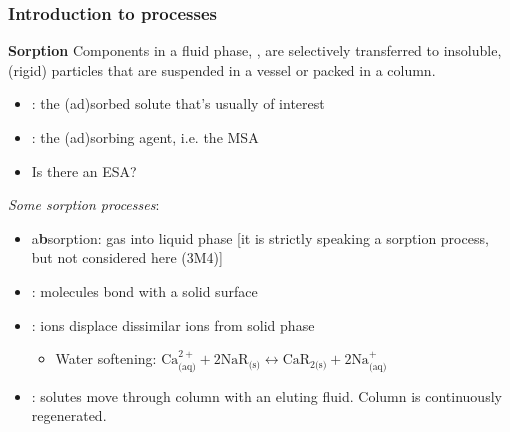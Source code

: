 \begin{comment}
	Pretreatment prior to carbon adsorption is usually for removal of suspended solids. Often this process is used as tertiary treatment after primary and biological treatment. In either situation, the carbon columns must be designed to provide for backwash. Some solids will escape pretreatment, and biological growth will occur on the carbon, even with extensive pretreatment. Originally carbon treatment was viewed only as applicable for removal of toxic organics or those that are difficult to degrade biologically. Present practice applies carbon adsorption as a procedure for removal of all types of organics. It is realized that some biological activity will occur in virtually any activated carbon unit, so the design must be adjusted accordingly.
\end{comment}

\begin{frame}\frametitle{Introduction to \textbf{{\color{purple}{sorption}}} processes}
	\begin{exampleblock}{\textbf{Sorption}}
		Components in a fluid phase, {\color{myGreen}{solutes}}, are selectively transferred to insoluble, (rigid) particles that are suspended in a vessel or packed in a column.
	\end{exampleblock}
	\begin{itemize}
		\item	{\color{purple}{(ad)sorbate}}: the (ad)sorbed solute that's usually of interest
		\item	{\color{purple}{(ad)sorbent}}: the (ad)sorbing agent, i.e. the MSA
		\item	Is there an ESA?
	\end{itemize}
	
	\vspace{12pt}
	\emph{Some sorption processes}:
	\begin{itemize}
		\item	a\textbf{b}sorption: gas into liquid phase [it is strictly speaking a sorption process, but not considered here (3M4)]
		\item	{\color{purple}{adsorption}}: molecules bond with a solid surface
		\item	{\color{purple}{ion-exchange}}: ions displace dissimilar ions from solid phase
			\begin{itemize}
				\item	Water softening: $\text{Ca}^{2+}_\text{(aq)} + 2\text{NaR}_\text{(s)} \longleftrightarrow \text{CaR}_{2\text{(s)}} + 2\text{Na}^{+}_\text{(aq)}$
			\end{itemize}
		\item	{\color{purple}{chromatography}}: solutes move through column with an eluting fluid. Column is continuously regenerated.
	\end{itemize}	
\end{frame}

